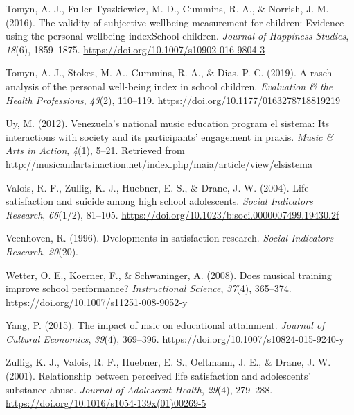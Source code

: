 \documentclass[a4, 12pt]{article}
\begin{document}
\leavevmode\hypertarget{ref-Tomyn2016}{}%
Tomyn, A. J., Fuller-Tyszkiewicz, M. D., Cummins, R. A., \& Norrish, J. M. (2016). The validity of subjective wellbeing measurement for children: Evidence using the personal wellbeing indexSchool children. \emph{Journal of Happiness Studies}, \emph{18}(6), 1859--1875. \url{https://doi.org/10.1007/s10902-016-9804-3}

\leavevmode\hypertarget{ref-Tomyn2019}{}%
Tomyn, A. J., Stokes, M. A., Cummins, R. A., \& Dias, P. C. (2019). A rasch analysis of the personal well-being index in school children. \emph{Evaluation \& the Health Professions}, \emph{43}(2), 110--119. \url{https://doi.org/10.1177/0163278718819219}

\leavevmode\hypertarget{ref-Uy2012}{}%
Uy, M. (2012). Venezuela's national music education program el sistema: Its interactions with society and its participants' engagement in praxis. \emph{Music \& Arts in Action}, \emph{4}(1), 5--21. Retrieved from \url{http://musicandartsinaction.net/index.php/maia/article/view/elsistema}

\leavevmode\hypertarget{ref-Valois2004}{}%
Valois, R. F., Zullig, K. J., Huebner, E. S., \& Drane, J. W. (2004). Life satisfaction and suicide among high school adolescents. \emph{Social Indicators Research}, \emph{66}(1/2), 81--105. \url{https://doi.org/10.1023/b:soci.0000007499.19430.2f}

\leavevmode\hypertarget{ref-Veenhoven1996}{}%
Veenhoven, R. (1996). Dvelopments in satisfaction research. \emph{Social Indicators Research}, \emph{20}(20).

\leavevmode\hypertarget{ref-Wetter2008}{}%
Wetter, O. E., Koerner, F., \& Schwaninger, A. (2008). Does musical training improve school performance? \emph{Instructional Science}, \emph{37}(4), 365--374. \url{https://doi.org/10.1007/s11251-008-9052-y}

\leavevmode\hypertarget{ref-Yang2015}{}%
Yang, P. (2015). The impact of msic on educational attainment. \emph{Journal of Cultural Economics}, \emph{39}(4), 369--396. \url{https://doi.org/10.1007/s10824-015-9240-y}

\leavevmode\hypertarget{ref-Zullig2001}{}%
Zullig, K. J., Valois, R. F., Huebner, E. S., Oeltmann, J. E., \& Drane, J. W. (2001). Relationship between perceived life satisfaction and adolescents' substance abuse. \emph{Journal of Adolescent Health}, \emph{29}(4), 279--288. \url{https://doi.org/10.1016/s1054-139x(01)00269-5}

\clearpage
\end{document}

